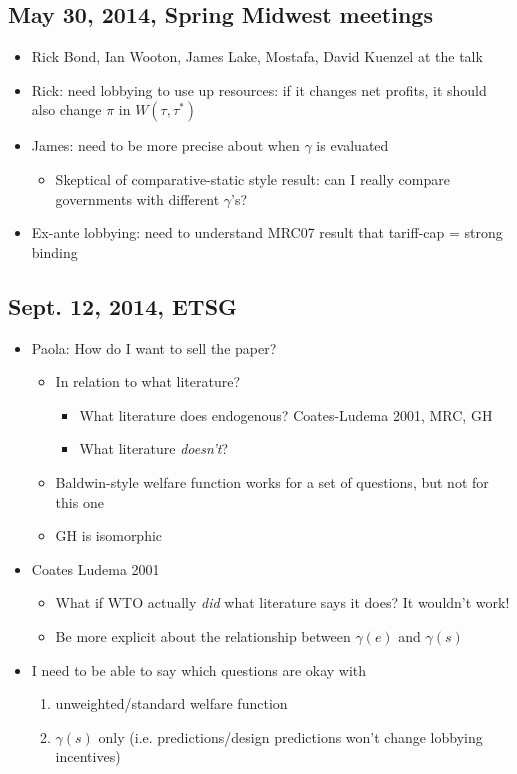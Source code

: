 \documentclass[12pt]{article}
\newcommand{\ga}{\gamma}
\begin{document}
\subsection{May 30, 2014, Spring Midwest meetings}
\begin{itemize}
	\item Rick Bond, Ian Wooton, James Lake, Mostafa, David Kuenzel at the talk
	\item Rick: need lobbying to use up resources: if it changes net profits, it should also change $\pi$ in $W(\tau,\tau^*)$
	\item James: need to be more precise about when $\ga$ is evaluated
		\begin{itemize}
			\item Skeptical of comparative-static style result: can I really compare governments with different $\ga$'s?
		\end{itemize}
	\item Ex-ante lobbying: need to understand MRC07 result that tariff-cap = strong binding
\end{itemize}

\subsection{Sept. 12, 2014, ETSG}
\begin{itemize}
	\item Paola: How do I want to sell the paper?
		\begin{itemize}
			\item In relation to what literature?
				\begin{itemize}
					\item What literature does endogenous? Coates-Ludema 2001, MRC, GH
					\item What literature \textit{doesn't}?
				\end{itemize}
			\item Baldwin-style welfare function works for a set of questions, but not for this one
			\item GH is isomorphic
		\end{itemize}
	\item Coates Ludema 2001
		\begin{itemize}
			\item What if WTO actually \textit{did} what literature says it does? It wouldn't work!
			\item Be more explicit about the relationship between $\ga(e)$ and $\ga(s)$
		\end{itemize}
	\item I need to be able to say which questions are okay with
		\begin{enumerate}
			\item unweighted/standard welfare function
			\item $\ga(s)$ only (i.e. predictions/design predictions won't change lobbying incentives) 
		\end{enumerate}
\end{itemize}
\end{document}
